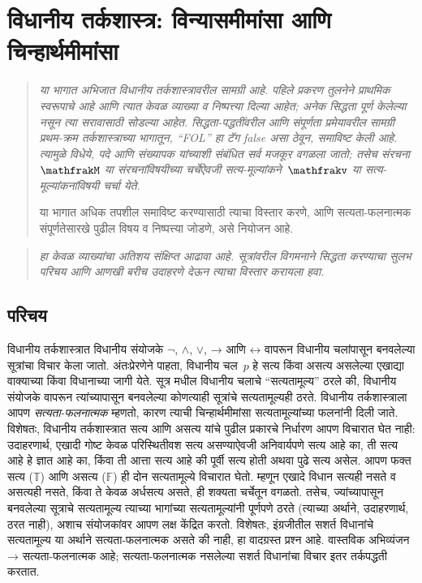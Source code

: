 \documentclass[11pt,a4paper,openany]{book}
\theoremstyle{definition}
\newcommand{\lif}{\mathbin{\to}}
\newcommand{\liff}{\mathbin{\leftrightarrow}}
\newenvironment{editorial}{\begin{quote}\small\itshape}{\end{quote}}
\newcommand{\applytofirst}[2]{{\expandafter#1#2}}
\newcommand{\Struct}[1]{\applytofirst{\mathfrak}{#1}}
\newcommand{\True}{\ensuremath{\mathbb{T}}}
\newcommand{\False}{\ensuremath{\mathbb{F}}}
\newcommand{\pAssign}[1]{\applytofirst{\mathfrak}{#1}}
\begin{document}
\chapter{विधानीय तर्कशास्त्र: विन्यासमीमांसा आणि चिन्हार्थमीमांसा}\label{pl:syn::chap}
\begin{editorial}
  या भागात अभिजात विधानीय तर्कशास्त्रावरील सामग्री आहे. पहिले
  प्रकरण तुलनेने प्राथमिक स्वरूपाचे आहे आणि त्यात केवळ व्याख्या
  व निष्पत्त्या दिल्या आहेत; अनेक सिद्धता पूर्ण केलेल्या नसून त्या
  सरावासाठी सोडल्या आहेत. सिद्धता-पद्धतींवरील आणि संपूर्णता
  प्रमेयावरील सामग्री प्रथम-क्रम तर्कशास्त्राच्या भागातून, ``FOL''
  हा टॅग false असा ठेवून, समाविष्ट केली आहे. त्यामुळे विधेये,
  पदे आणि संख्यापक यांच्याशी संबंधित सर्व मजकूर वगळला जातो;
  तसेच संरचना~$\Struct{M}$ या संरचनांविषयीच्या चर्चेऐवजी
  सत्य-मूल्यांकने~$\pAssign{v}$ या सत्य-मूल्यांकनांविषयी चर्चा येते.

  या भागात अधिक तपशील समाविष्ट करण्यासाठी त्याचा विस्तार करणे,
  आणि सत्यता-फलनात्मक संपूर्णतेसारखे पुढील विषय व निष्पत्त्या जोडणे,
  असे नियोजन आहे.
\end{editorial}
\begin{editorial}
  हा केवळ व्याख्यांचा अतिशय संक्षिप्त आढावा आहे. सूत्रांवरील
  विगमनाने सिद्धता करण्याचा सुलभ परिचय आणि आणखी बरीच उदाहरणे
  देऊन त्याचा विस्तार करायला हवा.
\end{editorial}






\section{परिचय}\label{pl:syn:int:sec}

विधानीय तर्कशास्त्रात विधानीय संयोजके
$\lnot$, $\land$, $\lor$, $\lif$ आणि $\liff$ वापरून
विधानीय चलांपासून बनवलेल्या सूत्रांचा विचार
केला जातो. अंतःप्रेरणेने पाहता, विधानीय चल~$p$
हे सत्य किंवा असत्य असलेल्या एखाद्या वाक्याच्या किंवा विधानाच्या
जागी येते. सूत्र मधील विधानीय चलाचे
``सत्यतामूल्य'' ठरले की, विधानीय संयोजके वापरून त्यांच्यापासून
बनवलेल्या कोणत्याही सूत्रांचे सत्यतामूल्यही ठरते. विधानीय
तर्कशास्त्राला आपण \emph{सत्यता-फलनात्मक} म्हणतो, कारण त्याची
चिन्हार्थमीमांसा सत्यतामूल्यांच्या फलनांनी दिली जाते. विशेषतः,
विधानीय तर्कशास्त्रात सत्य आणि असत्य यांचे पुढील प्रकारचे निर्धारण
आपण विचारात घेत नाही: उदाहरणार्थ, एखादी गोष्ट केवळ परिस्थितीवश
सत्य असण्याऐवजी अनिवार्यपणे सत्य आहे का, ती सत्य आहे हे ज्ञात आहे
का, किंवा ती आत्ता सत्य आहे की पूर्वी सत्य होती अथवा पुढे सत्य
असेल. आपण फक्त सत्य ($\True$) आणि असत्य ($\False$) ही दोन
सत्यतामूल्ये विचारात घेतो. म्हणून एखादे विधान सत्यही नसते व
असत्यही नसते, किंवा ते केवळ अर्धसत्य असते, ही शक्यता चर्चेतून
वगळतो. तसेच, ज्यांच्यापासून बनवलेल्या सूत्राचे सत्यतामूल्य
त्याच्या भागांच्या सत्यतामूल्यांनी पूर्णपणे ठरते (त्याच्या अर्थाने,
उदाहरणार्थ, ठरत नाही), अशाच संयोजकांवर आपण लक्ष केंद्रित करतो.
विशेषतः, इंग्रजीतील सशर्त विधानांचे सत्यतामूल्य या अर्थाने
सत्यता-फलनात्मक असते की नाही, हा वादग्रस्त प्रश्न आहे. वास्तविक
अभिव्यंजन~$\lif$ सत्यता-फलनात्मक आहे; सत्यता-फलनात्मक नसलेल्या सशर्त
विधानांचा विचार इतर तर्कपद्धती करतात.
\end{document}
